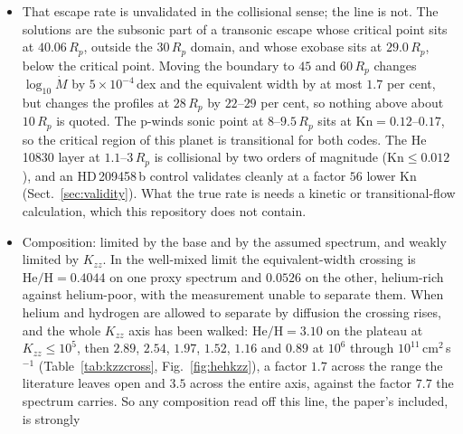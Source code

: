 \documentclass[english,a4paper]{my_memo}
\begin{document}
\begin{itemize}
      $\log_{10}\dot M = 7.84$--$7.87$ on the GJ\,1132 proxy, a factor
      $2.7$ below the value the retrieval imposes, and nearly independent of
      composition, of diffusion, of the eddy coefficient and now also of
      what is placed at the lower boundary (the flux-consistent sequence
      gives $7.90$--$7.91$). On the GJ\,699 proxy, $5.1\times$ brighter in
      XUV, it is $8.55$--$8.57$: within $0.06$\,dex of the value the paper
      retrieves on that same proxy (Sect.~\ref{sec:gj699}).
\item That escape rate is unvalidated in the collisional sense; the line is
      not. The solutions are the subsonic part of a transonic
      escape whose critical point sits at $40.06\,R_p$, outside the
      $30\,R_p$ domain, and whose exobase sits at $29.0\,R_p$, below the
      critical point. Moving the boundary to $45$ and $60\,R_p$ changes
      $\log_{10}\dot M$ by $5\times10^{-4}$\,dex and the equivalent width by
      at most $1.7$ per cent, but changes the profiles at $28\,R_p$ by
      $22$--$29$ per cent, so nothing above about $10\,R_p$ is quoted. The
      p-winds sonic point at $8$--$9.5\,R_p$ sits at
      $\mathrm{Kn} = 0.12$--$0.17$, so the critical region of this planet is
      transitional for both codes. The He\,10830 layer at $1.1$--$3\,R_p$
      is collisional by two orders of magnitude ($\mathrm{Kn} \le 0.012$),
      and an HD\,209458\,b control validates cleanly at a factor $56$ lower
      $\mathrm{Kn}$ (Sect.~\ref{sec:validity}). What the true rate is needs
      a kinetic or transitional-flow calculation, which this repository does
      not contain.
\item Composition: limited by the base and by the assumed spectrum, and
      weakly limited by $K_{zz}$. In the well-mixed limit the
      equivalent-width crossing is $\mathrm{He/H} = 0.4044$ on one proxy
      spectrum and $0.0526$ on the other, helium-rich against helium-poor,
      with the measurement unable to separate them. When helium and hydrogen
      are allowed to separate by diffusion the crossing rises, and the whole
      $K_{zz}$ axis has been walked: $\mathrm{He/H} = 3.10$ on the plateau
      at $K_{zz} \le 10^{5}$, then $2.89$, $2.54$, $1.97$, $1.52$, $1.16$
      and $0.89$ at $10^{6}$ through $10^{11}$\,cm$^2$\,s$^{-1}$
      (Table~\ref{tab:kzzcross}, Fig.~\ref{fig:hehkzz}), a factor $1.7$
      across the range the literature leaves open and $3.5$ across the
      entire axis, against the factor $7.7$ the spectrum carries. So any
      composition read off this line, the paper's included, is strongly

\end{itemize}
\end{document}
